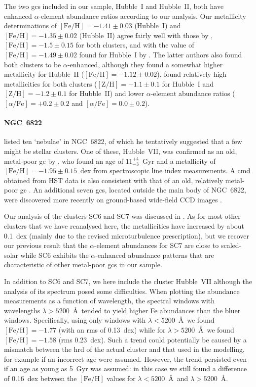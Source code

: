 \documentclass{aa}
\begin{document}
The two \acp{gc} included in our sample, Hubble~I and Hubble~II, both have enhanced $\alpha$-element abundance ratios according to our analysis.  Our metallicity determinations of $\mathrm{[Fe/H]}=-1.41\pm0.03$ (Hubble~I) and $\mathrm{[Fe/H]}=-1.35\pm0.02$ (Hubble~II) agree fairly well with those by \citet{DaCosta1988},  $\mathrm{[Fe/H]}=-1.5\pm0.15$ for both clusters, and with the value of $\mathrm{[Fe/H]}=-1.49\pm0.02$ found for Hubble~I by \citet{Colucci2011}. The latter authors also found both clusters to be $\alpha$-enhanced, although they found a somewhat higher metallicity for Hubble~II ($\mathrm{[Fe/H]}=-1.12\pm0.02$). \citet{Sharina2006} found relatively high metallicities for both clusters
($\mathrm{[Z/H]} = -1.1\pm0.1$ for Hubble~I and $\mathrm{[Z/H]} = -1.2\pm0.1$ for Hubble~II)
and lower $\alpha$-element abundance ratios ($[\alpha/\mathrm{Fe}] = +0.2\pm0.2$ and $[\alpha/\mathrm{Fe}] = 0.0\pm0.2$). 

\paragraph{NGC~6822}

\citet{Hubble1925} listed ten `nebulae' in NGC~6822, of which he tentatively suggested that a few might be stellar clusters. One of these, Hubble~VII, was confirmed as an old, metal-poor \ac{gc} by \citet{Cohen1998}, who found an age of $11^{+4}_{-3}$~Gyr and a metallicity of $\mathrm{[Fe/H]}=-1.95\pm0.15$~dex from spectroscopic line index measurements. A \ac{cmd} obtained from HST data is also consistent with that of an old, relatively metal-poor \ac{gc} \citep{Wyder2000}.
An additional seven \acp{gc}, located outside the main body of NGC~6822, were discovered more recently on ground-based wide-field CCD images \citep{Hwang2011,Huxor2013}.

Our analysis of the clusters SC6 and SC7 was discussed in \citet{Larsen2018}. As for most other clusters that we have reanalysed here, the metallicities have increased by about 0.1~dex (mainly due to the revised microturbulence prescription), but we recover our previous result that the $\alpha$-element abundances for SC7 are close to scaled-solar while SC6 exhibits the $\alpha$-enhanced abundance patterns that are characteristic of other metal-poor \acp{gc} in our sample. 

In addition to SC6 and SC7, we here include the cluster Hubble~VII although the analysis of its spectrum  posed some difficulties. When plotting the abundance measurements as a function of wavelength, the spectral windows with wavelengths $\lambda>5200$~\AA\ tended to yield higher Fe abundances than the bluer windows. Specifically, using only windows with $\lambda<5200$~\AA\ we found $\mathrm{[Fe/H]}=-1.77$ (with an rms of 0.13~dex) while for $\lambda>5200$~\AA\ we found $\mathrm{[Fe/H]}=-1.58$ (rms 0.23~dex). 
Such a trend could potentially be caused by a mismatch between the \ac{hrd} of the actual cluster and that used in the modelling, for example if an incorrect age were assumed. However, the trend persisted even if an age as young as 5~Gyr was assumed: in this case we still found a difference of 0.16~dex between the $\mathrm{[Fe/H]}$ values for $\lambda<5200$~\AA\ and $\lambda>5200$~\AA .
\end{document}
